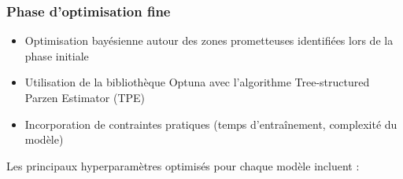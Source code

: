 \subsubsection{Phase d'optimisation fine}
\begin{itemize}
  \item Optimisation bayésienne autour des zones prometteuses identifiées lors de la phase initiale
  \item Utilisation de la bibliothèque Optuna avec l'algorithme Tree-structured Parzen Estimator (TPE)
  \item Incorporation de contraintes pratiques (temps d'entraînement, complexité du modèle)
\end{itemize}

Les principaux hyperparamètres optimisés pour chaque modèle incluent :

